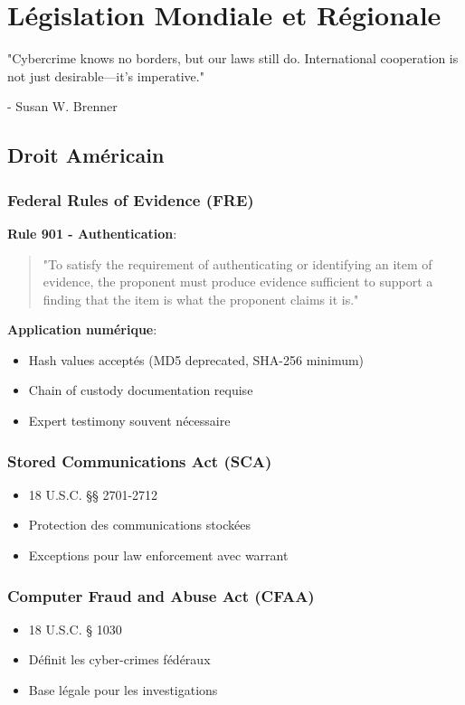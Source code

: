 \chapter{Législation Mondiale et Régionale}
\epigraph{"Cybercrime knows no borders, but our laws still do. International cooperation is not just desirable—it's imperative."}{- Susan W. Brenner}
\section{Droit Américain}
\subsection{Federal Rules of Evidence (FRE)}
\textbf{Rule 901 - Authentication}:

\begin{quote}
"To satisfy the requirement of authenticating or identifying an item of evidence, the proponent must produce evidence sufficient to support a finding that the item is what the proponent claims it is."
\end{quote}

\textbf{Application numérique}:

\begin{itemize}
\item Hash values acceptés (MD5 deprecated, SHA-256 minimum)
\item Chain of custody documentation requise
\item Expert testimony souvent nécessaire
\end{itemize}

\subsection{Stored Communications Act (SCA)}
\begin{itemize}
\item 18 U.S.C. §§ 2701-2712
\item Protection des communications stockées
\item Exceptions pour law enforcement avec warrant
\end{itemize}

\subsection{Computer Fraud and Abuse Act (CFAA)}
\begin{itemize}
\item 18 U.S.C. § 1030
\item Définit les cyber-crimes fédéraux
\item Base légale pour les investigations
\end{itemize}

